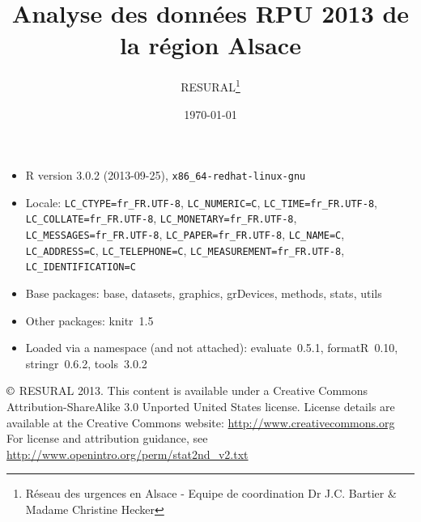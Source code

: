 \documentclass[12pt,english,french,twoside]{report}\usepackage[]{graphicx}\usepackage[]{color}
\begin{document}

\title{Analyse des données RPU 2013 de la région Alsace}
\author{RESURAL\thanks{Réseau des urgences en Alsace - Equipe de coordination Dr J.C.
Bartier \& Madame Christine Hecker}}
\date{\today}
\maketitle


\newpage
\chapter*{}
\vfill

\begin{itemize}\raggedright
  \item R version 3.0.2 (2013-09-25), \verb|x86_64-redhat-linux-gnu|
  \item Locale: \verb|LC_CTYPE=fr_FR.UTF-8|, \verb|LC_NUMERIC=C|, \verb|LC_TIME=fr_FR.UTF-8|, \verb|LC_COLLATE=fr_FR.UTF-8|, \verb|LC_MONETARY=fr_FR.UTF-8|, \verb|LC_MESSAGES=fr_FR.UTF-8|, \verb|LC_PAPER=fr_FR.UTF-8|, \verb|LC_NAME=C|, \verb|LC_ADDRESS=C|, \verb|LC_TELEPHONE=C|, \verb|LC_MEASUREMENT=fr_FR.UTF-8|, \verb|LC_IDENTIFICATION=C|
  \item Base packages: base, datasets, graphics, grDevices,
    methods, stats, utils
  \item Other packages: knitr~1.5
  \item Loaded via a namespace (and not attached): evaluate~0.5.1,
    formatR~0.10, stringr~0.6.2, tools~3.0.2
\end{itemize}




\noindent $\copyright$ RESURAL 2013. This content is available under a Creative Commons Attribution-ShareAlike 3.0 Unported United States license. License details are available at the Creative Commons website: \url{http://www.creativecommons.org} \\

\noindent For license and attribution guidance, see \url{http://www.openintro.org/perm/stat2nd_v2.txt}


\tableofcontents
\listoftables
\listoffigures
\end{document}
